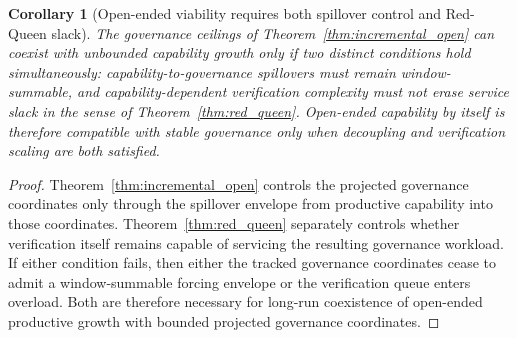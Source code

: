 \documentclass[11pt]{article}
\newtheorem{corollary}[theorem]{Corollary}
\theoremstyle{definition}
\newcommand{\1}{\mathbf{1}}
\begin{document}
\begin{corollary}[Open-ended viability requires both spillover control and Red-Queen slack]\label{cor:red_queen_open}
The governance ceilings of Theorem~\ref{thm:incremental_open} can coexist with unbounded capability growth only if two distinct conditions hold simultaneously: capability-to-governance spillovers must remain window-summable, and capability-dependent verification complexity must not erase service slack in the sense of Theorem~\ref{thm:red_queen}. Open-ended capability by itself is therefore compatible with stable governance only when \emph{decoupling} and \emph{verification scaling} are both satisfied.
\end{corollary}

\begin{proof}
Theorem~\ref{thm:incremental_open} controls the projected governance coordinates only through the spillover envelope from productive capability into those coordinates. Theorem~\ref{thm:red_queen} separately controls whether verification itself remains capable of servicing the resulting governance workload. If either condition fails, then either the tracked governance coordinates cease to admit a window-summable forcing envelope or the verification queue enters overload. Both are therefore necessary for long-run coexistence of open-ended productive growth with bounded projected governance coordinates.
\end{proof}
\end{document}
